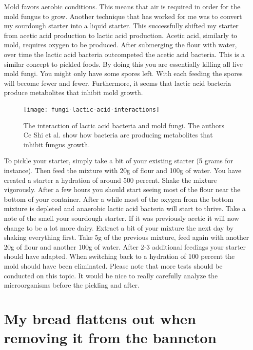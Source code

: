 Mold favors aerobic conditions. This means that air is required in order
for the mold fungus to grow. Another technique that has worked for me
was to convert my sourdough starter into a liquid starter. This successfully
shifted my starter from acetic acid production to lactic acid production.
Acetic acid, similarly to mold, requires oxygen to be produced. After
submerging the flour with water, over time the lactic acid bacteria
outcompeted the acetic acid bacteria. This is a similar concept to pickled
foods. By doing this you are essentially killing all live mold fungi. You
might only have some spores left. With each feeding the spores will become
fewer and fewer. Furthermore, it seems that lactic acid bacteria produce
metabolites that inhibit mold growth. \cite{mold+lactic+acid+bacteria}

\begin{figure}[!htb]
  \texttt{[image: fungi-lactic-acid-interactions]}
  \caption{The interaction of lactic acid bacteria and mold fungi.
           The authors Ce Shi et al. show how bacteria are producing
           metabolites that inhibit fungus growth. \cite{mold+lactic+acid+bacteria}}
  \label{fig:fungi-lactic-acid-interactions}
\end{figure}

To pickle your starter, simply take a bit of your existing starter (5 grams for
instance). Then feed the mixture with 20g of flour and 100g of water. You have
created a starter a hydration of around 500 percent. Shake the mixture vigorously.
After a few hours you should start seeing most of the flour near the bottom
of your container. After a while most of the oxygen from the bottom mixture
is depleted and anaerobic lactic acid bacteria will start to thrive. Take a
note of the smell your sourdough starter. If it was previously acetic
it will now change to be a lot more dairy. Extract a bit of your mixture the
next day by shaking everything first. Take 5g of the previous mixture, feed
again with another 20g of flour and another 100g of water. After 2-3
additional feedings your starter should have adapted. When switching back
to a hydration of 100 percent the mold should have been eliminated. Please note that
more tests should be conducted on this topic. It would be nice to really
carefully analyze the microorganisms before the pickling and after.

\section{My bread flattens out when removing it from the banneton}

